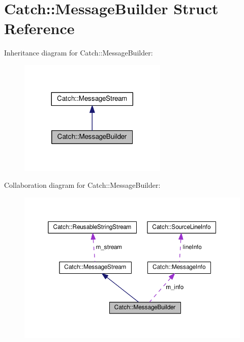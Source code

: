 \hypertarget{structCatch_1_1MessageBuilder}{}\section{Catch\+:\+:Message\+Builder Struct Reference}
\label{structCatch_1_1MessageBuilder}


Inheritance diagram for Catch\+:\+:Message\+Builder\+:\nopagebreak
\begin{figure}[H]
\begin{center}
\leavevmode
\includegraphics[width=200pt]{structCatch_1_1MessageBuilder__inherit__graph}
\end{center}
\end{figure}


Collaboration diagram for Catch\+:\+:Message\+Builder\+:\nopagebreak
\begin{figure}[H]
\begin{center}
\leavevmode
\includegraphics[width=350pt]{structCatch_1_1MessageBuilder__coll__graph}
\end{center}
\end{figure}
